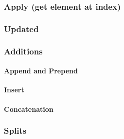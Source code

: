 
\subsubsection{Apply (get element at index)}



\subsubsection{Updated}



\subsubsection{Additions}

\paragraph{Append and Prepend}

\paragraph{Insert}


\paragraph{Concatenation}



\subsubsection{Splits}



